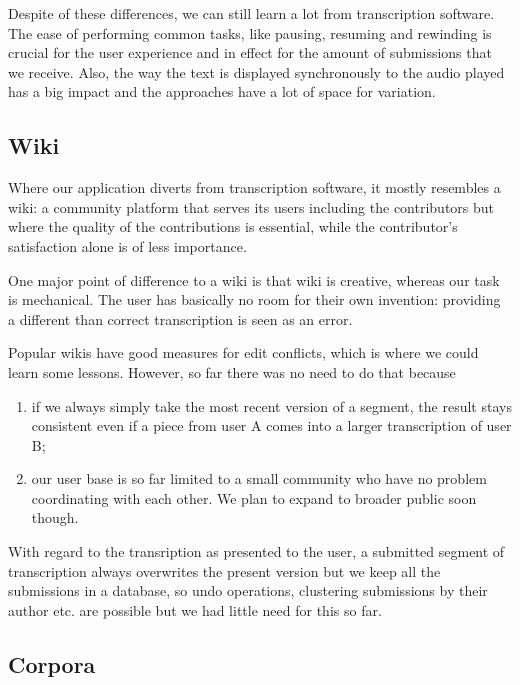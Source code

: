 \documentclass{svproc}
\begin{document}
\vspace{5mm}

Despite of these differences, we can still learn a lot from transcription
software. The ease of performing common tasks, like pausing, resuming and
rewinding is crucial for the user experience and in effect for the amount of
submissions that we receive. Also, the way the text is displayed synchronously
to the audio played has a big impact and the approaches have a lot of space for
variation.

\subsection{Wiki}

Where our application diverts from transcription software, it mostly resembles a
wiki: a community platform that serves its users including the contributors but
where the quality of the contributions is essential, while the contributor's
satisfaction alone is of less importance.

One major point of difference to a wiki is that wiki is creative, whereas our
task is mechanical. The user has basically no room for their own invention:
providing a different than correct transcription is seen as an error.

Popular wikis have good measures for edit conflicts, which is where we could
learn some lessons. However, so far there was no need to do that because
\begin{enumerate}
\item{if we always simply take the most recent version
of a segment, the result stays consistent even if a piece from user A comes into
a larger transcription of user B;}
\item{our user base is so far limited to a small community who have no problem
coordinating with each other. We plan to expand to broader public soon though.}
\end{enumerate}

With regard to the transription as presented to the user, a submitted segment of
transcription always overwrites the present version but we keep all the
submissions in a database, so undo operations, clustering submissions by their
author etc. are possible but we had little need for this so far.

\subsection{Corpora}
\end{document}
